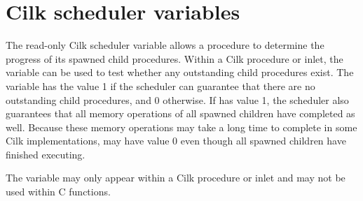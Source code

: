 \section{Cilk scheduler variables}
\label{lanref:synched-sec}

The read-only Cilk scheduler variable  allows a
procedure to determine the progress of its spawned child procedures.
Within a Cilk procedure or inlet, the variable  can be
used to test whether any outstanding child procedures exist.  The
variable  has the value 1 if the scheduler can
guarantee that there are no outstanding child procedures, and 0
otherwise.  If  has value 1, the scheduler also
guarantees that all memory operations of all spawned children have
completed as well.  Because these memory operations may take a long
time to complete in some Cilk implementations,  may
have value 0 even though all spawned children have finished executing.

The variable  may only appear within a Cilk procedure
or inlet and may not be used within C functions.
